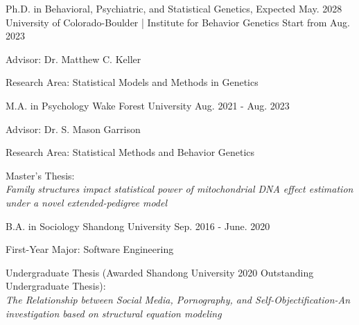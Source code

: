 

\begin{cventries}

  \cventry
    {Ph.D. in Behavioral, Psychiatric, and Statistical Genetics, Expected May. 2028} %
    {University of Colorado-Boulder | Institute for Behavior Genetics} %
    {Start from Aug. 2023} %
    {} %
    {
      \begin{cvitems} %
        \item {Advisor: Dr. Matthew C. Keller}
        \item {Research Area: Statistical Models and Methods in Genetics}
      \end{cvitems}
    }
    
  \cventry
    {M.A. in Psychology} %
    {Wake Forest University} %
    {Aug. 2021 - Aug. 2023} %
    {} %
    {
      \begin{cvitems} %
        \item {Advisor: Dr. S. Mason Garrison}
        \item {Research Area: Statistical Methods and Behavior Genetics}
        \item {Master's Thesis: \\
        \textit{Family structures impact statistical power of mitochondrial DNA effect estimation under a novel extended-pedigree model}}
      \end{cvitems}
    }
    
   \cventry
    {B.A. in Sociology} %
    {Shandong University} %
    {Sep. 2016 - June. 2020} %
    {} %
    {
      \begin{cvitems} %
        \item {First-Year Major: Software Engineering}
        \item {Undergraduate Thesis (Awarded Shandong University 2020 Outstanding Undergraduate Thesis): \\ \textit{The Relationship between Social Media, Pornography, and Self-Objectification-An investigation based on structural equation modeling}}
      \end{cvitems}
    }
    

\end{cventries}
